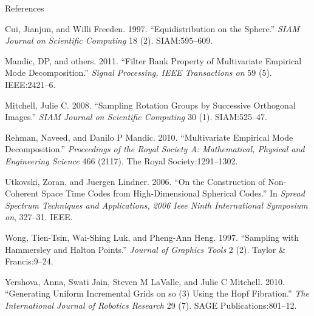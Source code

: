 \documentclass[10pt,ignorenonframetext,serif,onlymath]{beamer}
\begin{document}
\begin{frame}[allowframebreaks]{References}
\protect\hypertarget{references}{}

\hypertarget{refs}{}
\leavevmode\hypertarget{ref-cui1997equidistribution}{}%
Cui, Jianjun, and Willi Freeden. 1997. “Equidistribution on the Sphere.”
\emph{SIAM Journal on Scientific Computing} 18 (2). SIAM:595–609.

\leavevmode\hypertarget{ref-mandic2011filter}{}%
Mandic, DP, and others. 2011. “Filter Bank Property of Multivariate
Empirical Mode Decomposition.” \emph{Signal Processing, IEEE
Transactions on} 59 (5). IEEE:2421–6.

\leavevmode\hypertarget{ref-mitchell2008sampling}{}%
Mitchell, Julie C. 2008. “Sampling Rotation Groups by Successive
Orthogonal Images.” \emph{SIAM Journal on Scientific Computing} 30 (1).
SIAM:525–47.

\leavevmode\hypertarget{ref-rehman2010multivariate}{}%
Rehman, Naveed, and Danilo P Mandic. 2010. “Multivariate Empirical Mode
Decomposition.” \emph{Proceedings of the Royal Society A: Mathematical,
Physical and Engineering Science} 466 (2117). The Royal
Society:1291–1302.

\leavevmode\hypertarget{ref-utkovski2006construction}{}%
Utkovski, Zoran, and Juergen Lindner. 2006. “On the Construction of
Non-Coherent Space Time Codes from High-Dimensional Spherical Codes.” In
\emph{Spread Spectrum Techniques and Applications, 2006 Ieee Ninth
International Symposium on}, 327–31. IEEE.

\leavevmode\hypertarget{ref-wong1997sampling}{}%
Wong, Tien-Tsin, Wai-Shing Luk, and Pheng-Ann Heng. 1997. “Sampling with
Hammersley and Halton Points.” \emph{Journal of Graphics Tools} 2 (2).
Taylor \& Francis:9–24.

\leavevmode\hypertarget{ref-yershova2010generating}{}%
Yershova, Anna, Swati Jain, Steven M LaValle, and Julie C Mitchell.
2010. “Generating Uniform Incremental Grids on so (3) Using the Hopf
Fibration.” \emph{The International Journal of Robotics Research} 29
(7). SAGE Publications:801–12.

\end{frame}
\end{document}
